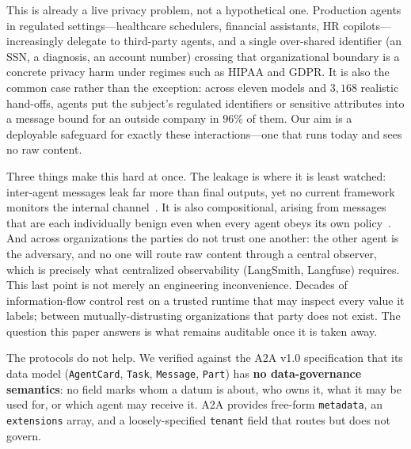\documentclass{article}
\begin{document}
This is already a live privacy problem, not a hypothetical one. Production agents
in regulated settings---healthcare schedulers, financial assistants, HR
copilots---increasingly delegate to third-party agents, and a single over-shared
identifier (an SSN, a diagnosis, an account number) crossing that organizational
boundary is a concrete privacy harm under regimes such as HIPAA and GDPR. It is
also the common case rather than the exception: across eleven models and $3{,}168$ realistic hand-offs, agents put the subject's regulated identifiers or sensitive attributes into a message bound for an outside company in $96\%$ of them. Our aim is a
deployable safeguard for exactly these interactions---one that runs today and sees
no raw content.

Three things make this hard at once. The leakage is where it is least watched:
inter-agent messages leak far more than final outputs, yet no current framework
monitors the internal channel~\citep{agentleak}. It is also compositional, arising
from messages that are each individually benign even when every agent obeys its
own policy~\citep{sumleaks}. And across organizations the parties do not trust one
another: the other agent is the adversary, and no one will route raw content
through a central observer, which is precisely what centralized observability
(LangSmith, Langfuse) requires. This last point is not merely an engineering
inconvenience. Decades of information-flow control rest on a trusted runtime that
may inspect every value it labels; between mutually-distrusting organizations
that party does not exist. The question this paper answers is what remains
auditable once it is taken away.

The protocols do not help. We verified against the A2A v1.0 specification that its
data model (\texttt{AgentCard}, \texttt{Task}, \texttt{Message}, \texttt{Part})
has \textbf{no data-governance semantics}: no field marks whom a datum is about,
who owns it, what it may be used for, or which agent may receive it. A2A provides
free-form \texttt{metadata}, an \texttt{extensions} array, and a loosely-specified
\texttt{tenant} field that routes but does not govern.
\end{document}
